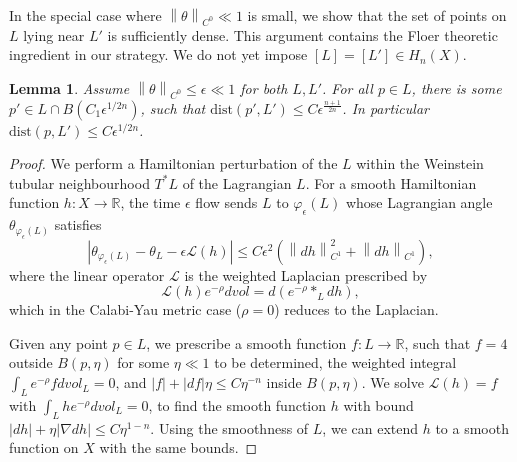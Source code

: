 \documentclass[a4paper]{article}
\newtheorem{lem}[thm]{Lemma}
\theoremstyle{definition}
\newcommand{\R}{\mathbb{R}}
\newcommand{\norm}[1]{\left\lVert#1\right\rVert}
\begin{document}
In the special case where $\norm{\theta}_{C^0}\ll 1$ is small, we show that the set of points on $L$ lying near $L'$ is sufficiently dense. This argument contains the Floer theoretic ingredient in our strategy. We do not yet impose $[L]=[L']\in H_n(X)$. 



\begin{lem}\label{smallC0density}
Assume $\norm{\theta}_{C^0}\leq \epsilon\ll 1$ for both $L, L'$. 
For all $p\in L$, there is some $p'\in L\cap B(C_1\epsilon^{1/2n})$, such that $\text{dist}(p', L')\leq C\epsilon^{\frac{n+1}{2n}  }	 $. In particular $\text{dist}(p,L')\leq C\epsilon^{ 1/2n  }$.
\end{lem}




\begin{proof}
We perform a Hamiltonian perturbation of the $L$ within the Weinstein tubular neighbourhood $T^*L$ of the Lagrangian $L$.
For a smooth Hamiltonian function $h: X\to \R$, the time $\epsilon$ flow sends $L$ to $\varphi_\epsilon(L)$ whose Lagrangian angle $\theta_{\varphi_\epsilon(L)}$ satisfies
\[
|\theta_{\varphi_\epsilon(L)}- \theta_L -  \epsilon \mathcal{L}(h) |\leq  C\epsilon^2(\norm{dh}_{C^1}^2+  \norm{dh}_{C^1}),
\]
where the linear operator $\mathcal{L}$ is the weighted Laplacian prescribed by
\[
\mathcal{L} (h) e^{-\rho}dvol =  d(e^{-\rho}*_L dh),
\]
which in the Calabi-Yau metric case ($\rho=0$) reduces to the Laplacian. 






Given any point $p\in L$, we prescribe a smooth function $f:L\to \R$, such that $f= 4$ outside  $B(p, \eta)$ for some $\eta\ll 1$ to be determined, the weighted integral $\int_L e^{-\rho} fdvol_L=0$, and $|f|+ | df|\eta \leq C \eta^{-n}$ inside $B(p,\eta)$. We solve $\mathcal{L}(h)=f$ with $\int_L he^{-\rho}dvol_L=0$, to find the smooth function $h$ with bound
$
|dh|+ \eta|\nabla dh| \leq C \eta^{1-n}.
$
Using the smoothness of $L$, we can extend $h$ to a smooth function on $X$ with the same bounds.




\end{proof}
\end{document}
